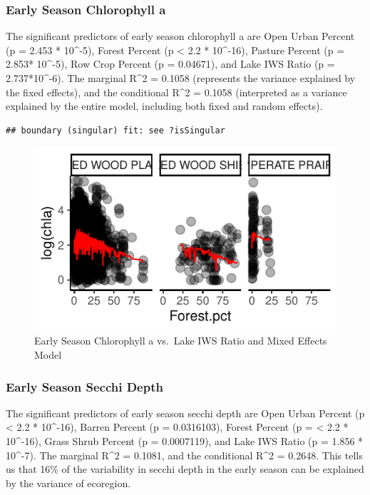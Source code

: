 \documentclass[12pt,]{article}
\begin{document}
\hypertarget{early-season-chlorophyll-a}{%
\subsubsection{Early Season Chlorophyll
a}\label{early-season-chlorophyll-a}}

The significant predictors of early season chlorophyll a are Open Urban
Percent (p = 2.453 * 10\^{}-5), Forest Percent (p \textless{} 2.2 *
10\^{}-16), Pasture Percent (p = 2.853* 10\^{}-5), Row Crop Percent (p =
0.04671), and Lake IWS Ratio (p = 2.737*10\^{}-6). The marginal R\^{}2 =
0.1058 (represents the variance explained by the fixed effects), and the
conditional R\^{}2 = 0.1058 (interpreted as a variance explained by the
entire model, including both fixed and random effects).

\begin{verbatim}
## boundary (singular) fit: see ?isSingular
\end{verbatim}

\begin{figure}
\centering
\includegraphics{Bollt_Greif_Raby_Roth_Project_Final_files/figure-latex/unnamed-chunk-17-1.pdf}
\caption{Early Season Chlorophyll a vs.~Lake IWS Ratio and Mixed Effects
Model}
\end{figure}

\hypertarget{early-season-secchi-depth}{%
\subsubsection{Early Season Secchi
Depth}\label{early-season-secchi-depth}}

The significant predictors of early season secchi depth are Open Urban
Percent (p \textless{} 2.2 * 10\^{}-16), Barren Percent (p = 0.0316103),
Forest Percent (p = \textless{} 2.2 * 10\^{}-16), Grass Shrub Percent (p
= 0.0007119), and Lake IWS Ratio (p = 1.856 * 10\^{}-7). The marginal
R\^{}2 = 0.1081, and the conditional R\^{}2 = 0.2648. This tells us that
16\% of the variability in secchi depth in the early season can be
explained by the variance of ecoregion.
\end{document}
